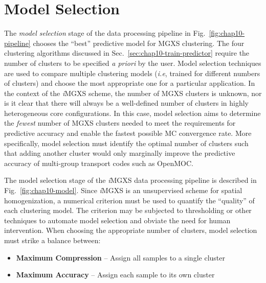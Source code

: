 \section{Model Selection}
\label{sec:chap10-model-select}

The \textit{model selection} stage of the data processing pipeline in Fig.~\ref{fig:chap10-pipeline} chooses the ``best'' predictive model for \ac{MGXS} clustering. The four clustering algorithms discussed in Sec.~\ref{sec:chap10-train-predictor} require the number of clusters to be specified \textit{a priori} by the user. Model selection techniques are used to compare multiple clustering models (\textit{i.e}, trained for different numbers of clusters) and choose the most appropriate one for a particular application. In the context of the \textit{i}\ac{MGXS} scheme, the number of \ac{MGXS} clusters is unknown, nor is it clear that there will always be a well-defined number of clusters in highly heterogeneous core configurations. In this case, model selection aims to determine the \textit{fewest} number of \ac{MGXS} clusters needed to meet the requirements for predictive accuracy and enable the fastest possible \ac{MC} convergence rate. More specifically, model selection must identify the optimal number of clusters such that adding another cluster would only marginally improve the predictive accuracy of multi-group transport codes such as OpenMOC. 

The model selection stage of the \textit{i}\ac{MGXS} data processing pipeline is described in Fig.~\ref{fig:chap10-model}. Since \textit{i}\ac{MGXS} is an unsupervised scheme for spatial homogenization, a numerical criterion must be used to quantify the ``quality'' of each clustering model. The criterion may be subjected to thresholding or other techniques to automate model selection and obviate the need for human intervention. When choosing the appropriate number of clusters, model selection must strike a balance between:

\begin{itemize}[noitemsep]
\item  \textbf{Maximum Compression} -- Assign all samples to a single cluster
\item \textbf{Maximum Accuracy} -- Assign each sample to its own cluster
\end{itemize}

